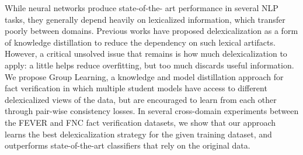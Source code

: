 While neural networks produce state-of-the- art performance in several NLP tasks, they generally depend heavily on lexicalized information, which transfer poorly between domains. Previous works have proposed delexicalization as a form of knowledge distillation to reduce the dependency on such lexical artifacts. However, a critical unsolved issue that remains is  how much delexicalization to apply: a little helps reduce overfitting, but too much discards useful information. We propose Group Learning, a knowledge and model distillation approach for fact verification in which multiple student models have access to different delexicalized views of the data, but are encouraged to learn from each other through pair-wise consistency losses. In several cross-domain experiments between the FEVER and FNC fact verification datasets, we show that our approach learns the best delexicalization strategy for the given training dataset, and outperforms state-of-the-art classifiers that rely on the original data.
